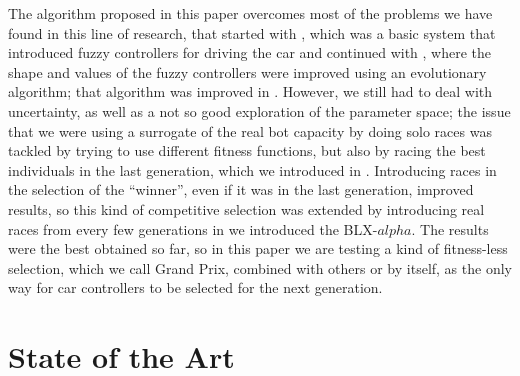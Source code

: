 \documentclass[10pt,journal,compsoc]{IEEEtran}
\begin{document}
The algorithm proposed in this paper overcomes most of the problems we
have found in this line of research, that started with
\cite{DBLP:conf/evoW/SalemMMG17}, which was a basic system that
introduced fuzzy controllers for driving the car and continued with
\cite{10.1007/978-3-319-77538-8_24}, where the shape and values of the
fuzzy controllers were improved using an evolutionary algorithm; that
algorithm was improved in \cite{DBLP:conf/ipmu/SalemMGG18}. However,
we still had to deal with uncertainty, as well as a not so good
exploration of the parameter space; the issue that we were using a
surrogate of the real bot capacity by doing solo races was tackled by
trying to use different fitness functions, but also by racing the best
individuals in the last generation, which we introduced in
\cite{salem_cig2018}. Introducing races in the selection of the
``winner'', even if it was in the last generation, improved results,
so this kind of competitive selection was extended by introducing real
races from every few generations in 
\cite{DBLP:conf/cig/SalemMG19} we introduced the BLX-$alpha$. The
results were the best obtained so far, so in this paper we are testing
a kind of fitness-less selection, which we call Grand Prix, combined
with others or by itself, as the only way for car controllers to be
selected for the next generation.



\section{State of the Art}
\label{sec:soa}


\end{document}
